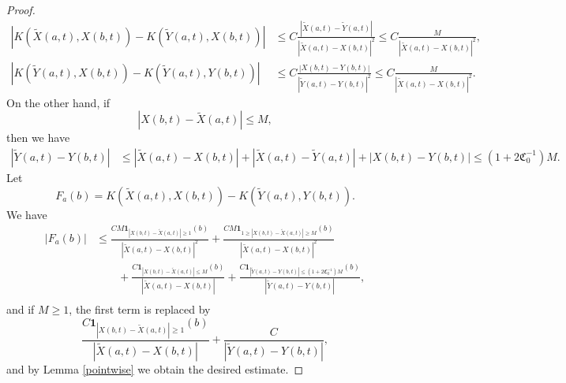 \documentclass[12pt]{article}
\begin{document}
\begin{proof}
\begin{equation*}
\begin{split}
\left | K(\tilde X(a,t), X(b,t) ) - K(\tilde Y(a,t), X(b,t) ) \right | &\le  C \frac{|\tilde X(a,t) - \tilde Y(a,t) | }{|\tilde X(a,t) -X(b,t) |^2}  \le C \frac{ M } {|\tilde X(a,t) - X(b,t) |^2} , \\
\left | K(\tilde Y(a,t), X(b,t) ) - K(\tilde Y(a,t), Y(b,t) ) \right | &\le C \frac{|X(b,t) - Y(b,t) | }{ |\tilde Y(a,t) - Y(b,t) | ^2 } \le C \frac{M }{|\tilde{X}(a,t) - X(b,t) |^2}.
\end{split}
\end{equation*}
On the other hand, if
\begin{equation}\label{abclose}
|X(b,t) -\tilde X(a,t) | \le M,  
\end{equation}
then we have
\begin{equation}
\begin{split}\nonumber
|\tilde Y(a, t) - Y(b,t) | &\le |\tilde X(a,t) -  X(b,t) | +|\tilde X (a,t) - \tilde Y(a, t) | + | X(b,t) - Y(b,t) | \le (1+2 \mathfrak{C}_0 ^{-1} ) M.
\end{split}
\end{equation}
Let 
\begin{equation}
F_{a} (b) = K(\tilde{X} (a,t), X(b,t) ) - K(\tilde{Y} (a,t) , Y(b,t) ).
\end{equation}
We have
\begin{equation}
\begin{split}
|F_{a} (b) | &\le   \frac{CM \mathbf{1}_{|X(b,t) - \tilde{X}(a,t) | \ge 1 } (b)}{|\tilde{X} (a,t) - X(b,t) |^2}  + \frac{C M  \mathbf{1}_{1 \ge |X(b,t) - \tilde{X}(a,t) | \ge M } (b) }{|\tilde{X} (a,t) - X(b,t) |^2} \\
&\qquad +  \frac{C \mathbf{1}_{|X(b,t) - \tilde{X}(a,t) | \le M } (b)}{|\tilde{X}(a,t) - X(b,t) | } + \frac{ C \mathbf{1}_{|\tilde{Y}(a,t) - Y(b,t) | \le (1+2 \mathfrak{C}_0^{-1} ) M } (b)}{|\tilde{Y}(a,t) - Y(b,t) | }, \\
\end{split}
\end{equation}
and if $M \ge 1$, the first term is replaced by
\begin{equation}
 \frac{C \mathbf{1}_{|X(b,t) - \tilde{X} (a,t) | \ge 1} (b)}{|\tilde{X}(a,t) - X(b,t) |} + \frac{C}{|\tilde{Y}(a,t) - Y(b,t) |},
\end{equation}
and by Lemma \ref{pointwise} we obtain the desired estimate.
\end{proof}
\end{document}
